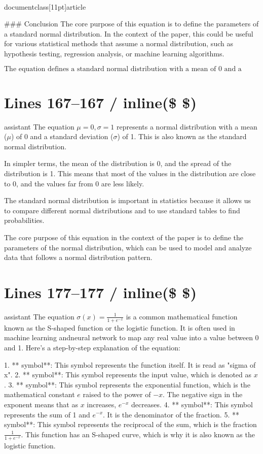 \\documentclass[11pt]{article}
\begin{document}
### Conclusion
The core purpose of this equation is to define the parameters of a standard normal distribution. In the context of the paper, this could be useful for various statistical methods that assume a normal distribution, such as hypothesis testing, regression analysis, or machine learning algorithms.

\[
\boxed{\text{The equation defines a standard normal distribution with a mean of 0 and a standard deviation of 1.}}
\]


\section*{Lines 167–167 / inline(\$ \$) }
assistant
The equation \(\mu=0,\sigma=1\) represents a normal distribution with a mean (\(\mu\)) of 0 and a standard deviation (\(\sigma\)) of 1. This is also known as the standard normal distribution.

In simpler terms, the mean of the distribution is 0, and the spread of the distribution is 1. This means that most of the values in the distribution are close to 0, and the values far from 0 are less likely.

The standard normal distribution is important in statistics because it allows us to compare different normal distributions and to use standard tables to find probabilities.

The core purpose of this equation in the context of the paper is to define the parameters of the normal distribution, which can be used to model and analyze data that follows a normal distribution pattern.


\section*{Lines 177–177 / inline(\$ \$) }
assistant
The equation \(\sigma(x) = \frac{1}{1 + e^{-x}}\) is a common mathematical function known as the S-shaped function or the logistic function. It is often used in machine learning andneural network to map any real value into a value between 0 and 1. Here's a step-by-step explanation of the equation:

1. ** symbol**: This symbol represents the function itself. It is read as "sigma of x".
2. ** symbol**: This symbol represents the input value, which is denoted as \(x\).
3. ** symbol**: This symbol represents the exponential function, which is the mathematical constant \(e\) raised to the power of \(-x\). The negative sign in the exponent means that as \(x\) increases, \(e^{-x}\) decreases.
4. ** symbol**: This symbol represents the sum of 1 and \(e^{-x}\). It is the denominator of the fraction.
5. ** symbol**: This symbol represents the reciprocal of the sum, which is the fraction \(\frac{1}{1 + e^{-x}}\). This function has an S-shaped curve, which is why it is also known as the logistic function.
\end{document}
